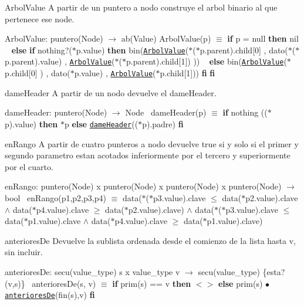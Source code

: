 \begin{DoxyParagraph}{Arbol\+Value}
A partir de un puntero a nodo construye el arbol binario al que pertenece ese node.

Arbol\+Value\+: puntero(\+Node) $\to$ ab(\+Value) Arbol\+Value(p) $\equiv$ {\bfseries if} p = null {\bfseries then} nil ~\newline
 {\bfseries else} {\bfseries if} nothing?($\ast$p.value) {\bfseries then} bin(\href{axiomas.html#ArbolValue}{\tt Arbol\+Value}($\ast$($\ast$p.parent).child\mbox{[}0\mbox{]} , dato($\ast$($\ast$p.parent).value) , \href{axiomas.html#ArbolValue}{\tt Arbol\+Value}($\ast$($\ast$p.parent).child\mbox{[}1\mbox{]}) )) ~\newline
 {\bfseries else} bin(\href{axiomas.html#ArbolValue}{\tt Arbol\+Value}($\ast$p.child\mbox{[}0\mbox{]} ) , dato($\ast$p.value) , \href{axiomas.html#ArbolValue}{\tt Arbol\+Value}($\ast$p.child\mbox{[}1\mbox{]})) {\bfseries fi} {\bfseries fi} 
\end{DoxyParagraph}


\begin{DoxyParagraph}{dame\+Header}
A partir de un nodo devuelve el dame\+Header.

dame\+Header\+: puntero(\+Node) $\to$ Node~\newline
 dame\+Header(p) $\equiv$ {\bfseries if} nothing (($\ast$p).value) {\bfseries then} $\ast$p {\bfseries else} \href{axiomas.html#dameHeader}{\tt dame\+Header}(($\ast$p).padre) {\bfseries fi} 
\end{DoxyParagraph}


\begin{DoxyParagraph}{en\+Rango}
A partir de cuatro punteros a nodo devuelve true si y solo si el primer y segundo parametro estan acotados inferiormente por el tercero y superiormente por el cuarto.

en\+Rango\+: puntero(\+Node) x puntero(\+Node) x puntero(\+Node) x puntero(\+Node) $\to$ bool~\newline
 en\+Rango(p1,p2,p3,p4) $\equiv$ data($\ast$($\ast$p3.value).clave $\leq$ data($\ast$p2.value).clave $\land$ data($\ast$p4.value).clave $\geq$ data($\ast$p2.value).clave) $\land$ data($\ast$($\ast$p3.value).clave $\leq$ data($\ast$p1.value).clave $\land$ data($\ast$p4.value).clave $\geq$ data($\ast$p1.value).clave) 
\end{DoxyParagraph}


\begin{DoxyParagraph}{anteriores\+De}
Devuelve la sublista ordenada desde el comienzo de la lista hasta v, sin incluir.

anteriores\+De\+: secu(value\+\_\+type) s x value\+\_\+type v $\to$ secu(value\+\_\+type) \{esta?(v,s)\}~\newline
 anteriores\+De(s, v) $\equiv$ {\bfseries if} prim(s) == v {\bfseries then} $<$$>$ {\bfseries else} prim(s) $\bullet$ \href{axiomas.html#anterioresDe}{\tt anteriores\+De}(fin(s),v) {\bfseries fi} 
\end{DoxyParagraph}


